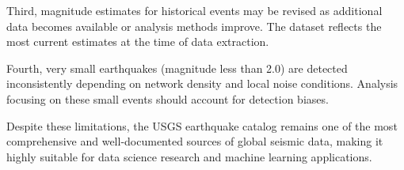 Third, magnitude estimates for historical events may be revised as additional data becomes available or analysis methods improve. The dataset reflects the most current estimates at the time of data extraction.

Fourth, very small earthquakes (magnitude less than 2.0) are detected inconsistently depending on network density and local noise conditions. Analysis focusing on these small events should account for detection biases.

Despite these limitations, the USGS earthquake catalog remains one of the most comprehensive and well-documented sources of global seismic data, making it highly suitable for data science research and machine learning applications.
